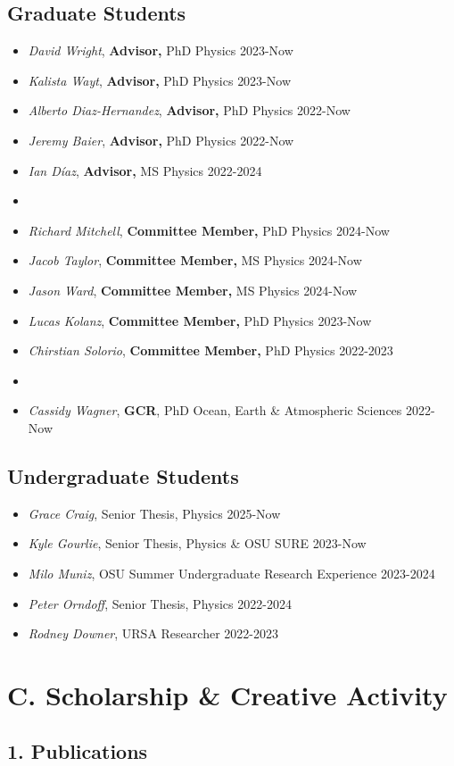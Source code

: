 \documentclass[11pt,letterpaper,sans,unicode]{moderncv}
\newcommand{\studentitem}[3]{\item \textit{#1}, {#2} \hfill{#3} } %
\begin{document}
\subsection{\hspace{0.4in}\color{color1}Graduate Students}
	\begin{itemize}[leftmargin=20mm]
		\studentitem{David Wright}{\textbf{Advisor,} PhD Physics}{2023-Now}
		\studentitem{Kalista Wayt}{\textbf{Advisor,} PhD Physics}{2023-Now}
		\studentitem{Alberto Diaz-Hernandez}{\textbf{Advisor,} PhD Physics}{2022-Now}
		\studentitem{Jeremy Baier}{\textbf{Advisor,} PhD Physics}{2022-Now}
		\studentitem{Ian D\'iaz}{\textbf{Advisor,} MS Physics}{2022-2024}
		\item[]
		\studentitem{Richard Mitchell}{\textbf{Committee Member,} PhD Physics}{2024-Now}
		\studentitem{Jacob Taylor}{\textbf{Committee Member,} MS Physics}{2024-Now}
		\studentitem{Jason Ward}{\textbf{Committee Member,} MS Physics}{2024-Now}
		\studentitem{Lucas Kolanz}{\textbf{Committee Member,} PhD Physics}{2023-Now}
		\studentitem{Chirstian Solorio}{\textbf{Committee Member,} PhD Physics}{2022-2023}
		\item[]
		\studentitem{Cassidy Wagner}{\textbf{GCR}, PhD Ocean, Earth \& Atmospheric Sciences}{2022-Now}
	\end{itemize}

\subsection{\hspace{0.4in}\color{color1}Undergraduate Students}
\begin{itemize}[leftmargin=20mm]
	\studentitem{Grace Craig}{Senior Thesis, Physics}{2025-Now}
	\studentitem{Kyle Gourlie}{Senior Thesis, Physics \& OSU SURE}{2023-Now}
	\studentitem{Milo Muniz}{OSU Summer Undergraduate Research Experience}{2023-2024}
	\studentitem{Peter Orndoff}{Senior Thesis, Physics}{2022-2024}
	\studentitem{Rodney Downer}{URSA Researcher}{2022-2023}
\end{itemize}


\section{C. Scholarship \& Creative Activity}
\subsection{1. Publications}
\end{document}

